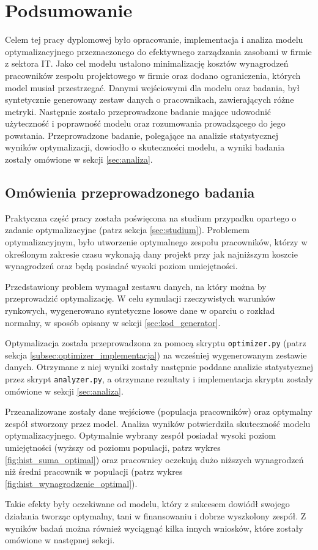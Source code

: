 \chapter*{Podsumowanie}
\par Celem tej pracy dyplomowej było opracowanie, implementacja i analiza modelu optymalizacyjnego przeznaczonego do efektywnego zarządzania zasobami w firmie z sektora IT. Jako cel modelu ustalono minimalizację kosztów wynagrodzeń pracowników zespołu projektowego w firmie oraz dodano ograniczenia, których model musiał przestrzegać. Danymi wejściowymi dla modelu oraz badania, był syntetycznie generowany zestaw danych o pracownikach, zawierających różne metryki. Następnie zostało przeprowadzone badanie mające udowodnić użyteczność i poprawność modelu oraz rozumowania prowadzącego do jego powstania. Przeprowadzone badanie, polegające na analizie statystycznej wyników optymalizacji, dowiodło o skuteczności modelu, a wyniki badania zostały omówione w sekcji \ref{sec:analiza}.

\section*{Omówienia przeprowadzonego badania}
\par Praktyczna część pracy została poświęcona na studium przypadku opartego o zadanie optymalizacyjne (patrz sekcja \ref{sec:studium}). Problemem optymalizacyjnym, było utworzenie optymalnego zespołu pracowników, którzy w określonym zakresie czasu wykonają dany projekt przy jak najniższym koszcie wynagrodzeń oraz będą posiadać wysoki poziom umiejętności.
\par Przedstawiony problem wymagał zestawu danych, na który można by przeprowadzić optymalizację. W celu symulacji rzeczywistych warunków rynkowych, wygenerowano syntetyczne losowe dane w oparciu o rozkład normalny, w sposób opisany w sekcji \ref{sec:kod_generator}. 
\par Optymalizacja została przeprowadzona za pomocą skryptu \verb|optimizer.py| (patrz sekcja \ref{subsec:optimizer_implementacja}) na wcześniej wygenerowanym zestawie danych. Otrzymane z niej wyniki zostały następnie poddane analizie statystycznej przez skrypt \verb|analyzer.py|, a otrzymane rezultaty i implementacja skryptu zostały omówione w sekcji \ref{sec:analiza}. 
\par Przeanalizowane zostały dane wejściowe (populacja pracowników) oraz optymalny zespół stworzony przez model. Analiza wyników potwierdziła skuteczność modelu optymalizacyjnego. Optymalnie wybrany zespół posiadał wysoki poziom umiejętności (wyższy od poziomu populacji, patrz wykres \ref{fig:hist_suma_optimal}) oraz pracownicy oczekują dużo niższych wynagrodzeń niż średni pracownik w populacji (patrz wykres \ref{fig:hist_wynagrodzenie_optimal}). 
\par Takie efekty były oczekiwane od modelu, który z sukcesem dowiódł swojego działania tworząc optymalny, tani w finansowaniu i dobrze wyszkolony zespół. Z wyników badań można również wyciągnąć kilka innych wniosków, które zostały omówione w następnej sekcji.

